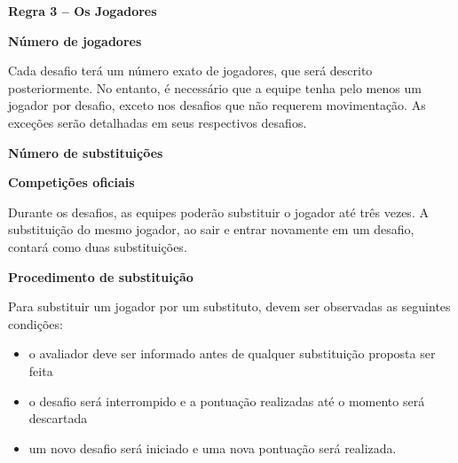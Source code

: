 \clearpage
\sffamily

{\bfseries\color[rgb]{0.4,0.4,0.4}
Regra 3 – Os Jogadores}
{}


\bigskip

{\bfseries Número de jogadores}

\headlinebox

Cada desafio terá um número exato de jogadores, que será descrito posteriormente. No entanto, é necessário que a equipe tenha pelo menos um jogador por desafio, exceto nos desafios que não requerem movimentação. As exceções serão detalhadas em seus respectivos desafios.

\bigskip

{\bfseries Número de substituições}

\headlinebox
 
{\bfseries Competições oficiais }

Durante os desafios, as equipes poderão substituir o jogador até três vezes. A substituição do mesmo jogador, ao sair e entrar novamente em um desafio, contará como duas substituições.

\bigskip

{\bfseries Procedimento de substituição}

\headlinebox

Para substituir um jogador por um substituto, devem ser observadas as seguintes condições:

\begin{itemize}
\item o avaliador deve ser informado antes de qualquer substituição proposta ser feita
\item o desafio será interrompido e a pontuação realizadas até o momento será descartada
\item um novo desafio será iniciado e uma nova pontuação será realizada.
\end{itemize}






